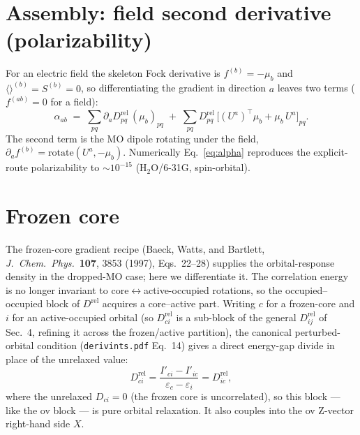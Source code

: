 \documentclass[11pt]{article}
\newcommand{\pd}[1]{\partial_{#1}}
\newcommand{\aeri}[1]{\langle #1 \rangle}   %
\begin{document}
\section{Assembly: field second derivative (polarizability)}
For an electric field the skeleton Fock derivative is $f^{(b)}=-\mu_b$ and
$\aeri{}^{(b)}=S^{(b)}=0$, so differentiating the gradient in direction $a$ leaves two terms
($f^{(ab)}=0$ for a field):
\begin{equation}
  \alpha_{ab} \;=\; \sum_{pq}\pd{a}D^{\mathrm{rel}}_{pq}\,(\mu_b)_{pq}
             \;+\; \sum_{pq}D^{\mathrm{rel}}_{pq}\,\big[(U^a)^{\!\top}\mu_b + \mu_b\,U^a\big]_{pq}.
  \label{eq:alpha}
\end{equation}
The second term is the MO dipole rotating under the field, $\pd{a}f^{(b)}=\mathrm{rotate}(U^a,-\mu_b)$.
Numerically Eq.~\eqref{eq:alpha} reproduces the explicit-route polarizability to
$\sim\!10^{-15}$ (H$_2$O/6-31G, spin-orbital).

\section{Frozen core}
The frozen-core gradient recipe (Baeck, Watts, and Bartlett, \emph{J.\ Chem.\ Phys.}\
\textbf{107}, 3853 (1997), Eqs.~22--28) supplies the orbital-response density in the
dropped-MO case; here we differentiate it.
The correlation energy is no longer invariant to core$\leftrightarrow$active-occupied
rotations, so the occupied--occupied block of $D^{\mathrm{rel}}$ acquires a core--active part.
Writing $c$ for a frozen-core and $i$ for an active-occupied orbital (so $D^{\mathrm{rel}}_{ci}$
is a sub-block of the general $D^{\mathrm{rel}}_{ij}$ of Sec.~4, refining it across the
frozen/active partition), the canonical perturbed-orbital condition (\texttt{derivints.pdf}
Eq.~14) gives a direct energy-gap divide in place of the unrelaxed value:
\begin{equation}
  D^{\mathrm{rel}}_{ci} = \frac{I'_{ci}-I'_{ic}}{\varepsilon_c-\varepsilon_i} = D^{\mathrm{rel}}_{ic},
\end{equation}
where the unrelaxed $D_{ci}=0$ (the frozen core is uncorrelated), so this block --- like the
ov block --- is pure orbital relaxation. It also couples into the ov Z-vector right-hand side
$X$.
\end{document}

